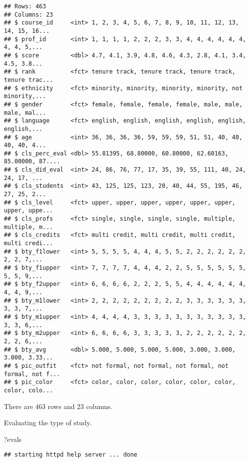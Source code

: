 \documentclass[
]{article}
\newenvironment{Shaded}{\begin{snugshade}}{\end{snugshade}}
\newcommand{\NormalTok}[1]{#1}
\begin{document}
\begin{verbatim}
## Rows: 463
## Columns: 23
## $ course_id     <int> 1, 2, 3, 4, 5, 6, 7, 8, 9, 10, 11, 12, 13, 14, 15, 16...
## $ prof_id       <int> 1, 1, 1, 1, 2, 2, 2, 3, 3, 4, 4, 4, 4, 4, 4, 4, 4, 5,...
## $ score         <dbl> 4.7, 4.1, 3.9, 4.8, 4.6, 4.3, 2.8, 4.1, 3.4, 4.5, 3.8...
## $ rank          <fct> tenure track, tenure track, tenure track, tenure trac...
## $ ethnicity     <fct> minority, minority, minority, minority, not minority,...
## $ gender        <fct> female, female, female, female, male, male, male, mal...
## $ language      <fct> english, english, english, english, english, english,...
## $ age           <int> 36, 36, 36, 36, 59, 59, 59, 51, 51, 40, 40, 40, 40, 4...
## $ cls_perc_eval <dbl> 55.81395, 68.80000, 60.80000, 62.60163, 85.00000, 87....
## $ cls_did_eval  <int> 24, 86, 76, 77, 17, 35, 39, 55, 111, 40, 24, 24, 17, ...
## $ cls_students  <int> 43, 125, 125, 123, 20, 40, 44, 55, 195, 46, 27, 25, 2...
## $ cls_level     <fct> upper, upper, upper, upper, upper, upper, upper, uppe...
## $ cls_profs     <fct> single, single, single, single, multiple, multiple, m...
## $ cls_credits   <fct> multi credit, multi credit, multi credit, multi credi...
## $ bty_f1lower   <int> 5, 5, 5, 5, 4, 4, 4, 5, 5, 2, 2, 2, 2, 2, 2, 2, 2, 7,...
## $ bty_f1upper   <int> 7, 7, 7, 7, 4, 4, 4, 2, 2, 5, 5, 5, 5, 5, 5, 5, 5, 9,...
## $ bty_f2upper   <int> 6, 6, 6, 6, 2, 2, 2, 5, 5, 4, 4, 4, 4, 4, 4, 4, 4, 9,...
## $ bty_m1lower   <int> 2, 2, 2, 2, 2, 2, 2, 2, 2, 3, 3, 3, 3, 3, 3, 3, 3, 7,...
## $ bty_m1upper   <int> 4, 4, 4, 4, 3, 3, 3, 3, 3, 3, 3, 3, 3, 3, 3, 3, 3, 6,...
## $ bty_m2upper   <int> 6, 6, 6, 6, 3, 3, 3, 3, 3, 2, 2, 2, 2, 2, 2, 2, 2, 6,...
## $ bty_avg       <dbl> 5.000, 5.000, 5.000, 5.000, 3.000, 3.000, 3.000, 3.33...
## $ pic_outfit    <fct> not formal, not formal, not formal, not formal, not f...
## $ pic_color     <fct> color, color, color, color, color, color, color, colo...
\end{verbatim}

There are 463 rows and 23 columns.

Evaluating the type of study.

\begin{Shaded}
\begin{Highlighting}[]
\NormalTok{?evals}
\end{Highlighting}
\end{Shaded}

\begin{verbatim}
## starting httpd help server ... done
\end{verbatim}
\end{document}
